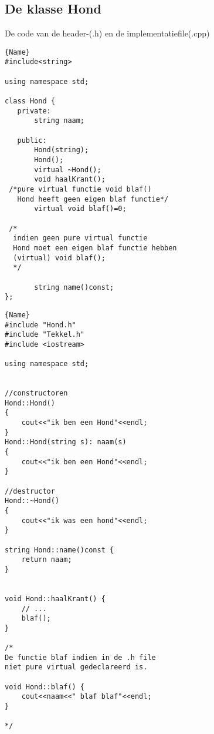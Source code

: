 \subsection{De klasse Hond}
De code van de header-(.h) en de implementatiefile(.cpp)\\ 

\noindent\hspace{-1.1cm}\begin{minipage}{.58\textwidth}
\begin{lstlisting}[caption=Hond declaratie file(.h),frame=tlrb,label={lst:vbHondH}]{Name}
#include<string>

using namespace std;

class Hond {
   private:
	   string naam;
	
   public:
       Hond(string);
       Hond();
       virtual ~Hond();
	   void haalKrant();
 /*pure virtual functie void blaf()
   Hond heeft geen eigen blaf functie*/
	   virtual void blaf()=0; 
	
 /*
  indien geen pure virtual functie
  Hond moet een eigen blaf functie hebben
  (virtual) void blaf(); 
  */
	
	   string name()const;
};
\end{lstlisting}
\end{minipage}\hfill
\hspace{0.9cm}\begin{minipage}{.58\textwidth}
\begin{lstlisting}[caption=Hond implementatie file file(.cpp),frame=tlrb,label={lst:vbHondCPP}]{Name}
#include "Hond.h"
#include "Tekkel.h"
#include <iostream>

using namespace std;


//constructoren
Hond::Hond()
{
	cout<<"ik ben een Hond"<<endl;
}
Hond::Hond(string s): naam(s)
{
	cout<<"ik ben een Hond"<<endl;
}

//destructor
Hond::~Hond()
{
	cout<<"ik was een hond"<<endl;
}

string Hond::name()const {
	return naam;
}


void Hond::haalKrant() {
	// ...
	blaf();
}

/*
De functie blaf indien in de .h file
niet pure virtual gedeclareerd is.

void Hond::blaf() {
	cout<<naam<<" blaf blaf"<<endl;
}

*/

\end{lstlisting}
\end{minipage}

